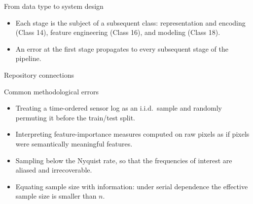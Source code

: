 \begin{frame}{From data type to system design}
\centering
{}
\vspace{0.5em}
\begin{itemize}
\item Each stage is the subject of a subsequent class: representation and encoding (Class 14), feature engineering (Class 16), and modeling (Class 18).
\item An error at the first stage propagates to every subsequent stage of the pipeline.
\end{itemize}
\coursefooter
\end{frame}

\begin{frame}{Repository connections}
\coursefooter
\end{frame}

\begin{frame}{Common methodological errors}
\begin{itemize}
\item Treating a time-ordered sensor log as an i.i.d.\ sample and randomly permuting it before the train/test split.
\item Interpreting feature-importance measures computed on raw pixels as if pixels were semantically meaningful features.
\item Sampling below the Nyquist rate, so that the frequencies of interest are aliased and irrecoverable.
\item Equating sample size with information: under serial dependence the effective sample size is smaller than $n$.
\end{itemize}
\coursefooter
\end{frame}

